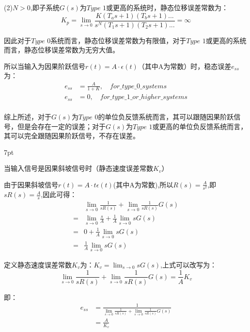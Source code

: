 \documentclass{article}
\numberwithin{equation}{section}
\numberwithin{figure}{section}
\newenvironment{formal}{%
\def\FrameCommand{%
\hspace{1pt}%
{\color{DarkBlue}\vrule width 2pt}%
{\color{formalshade}\vrule width 4pt}%
\colorbox{formalshade}%
}%
\MakeFramed{\advance\hsize-\width\FrameRestore}%
\noindent\hspace{-4.55pt}%
\begin{adjustwidth}{}{7pt}%
\vspace{2pt}\vspace{2pt}%
}
{%
\vspace{2pt}\end{adjustwidth}\endMakeFramed%
}
\begin{document}
    (2)$N>0$,即子系统$G(s)$为$Type$ $1$或更高的系统时，静态位移误差常数为：
    \begin{equation}
        K_p=\lim_{s\rightarrow 0}\frac{K(T_as+1)(T_bs+1)...}{s^N(T_1s+1)(T_2s+1)...}=\infty
    \end{equation}
    
    因此对于$Type$ $0$系统而言，静态位移误差常数为有限值，对于$Type$ $1$或更高的系统而言，静态位移误差常数为无穷大值。

    所以当输入为因果阶跃信号$r(t)=A·\epsilon(t)$（其中A为常数）时，稳态误差$e_{ss}$为：
\begin{equation}
    \begin{split}
        e_{ss}&=\frac{A}{1+K},\quad for\_type\_0\_systems\\
        e_{ss}&=0,\quad for\_type\_1\_or\_higher\_systems\\
    \end{split}
\end{equation}

综上所述，对于$G(s)$为$Type$ $0$的单位负反馈系统而言，其可以跟随因果阶跃信号，但是会存在一定的误差；对于$G(s)$为$Type$ $1$或更高的单位负反馈系统而言，其可以完全跟随因果阶跃信号，不存在误差。

\begin{formal}
    当输入信号是因果斜坡信号时（静态速度误差常数$K_v$）
\end{formal}

由于因果斜坡信号$r(t)=A·t\epsilon(t)$(其中A为常数),所以$R(s)=\frac{A}{s^2}$,即$sR(s)=\frac{A}{s}$,因此可得：
\begin{equation}
    \begin{split}
        &\lim_{s\rightarrow 0}\frac{1}{sR(s)}+\lim_{s\rightarrow 0}\frac{1}{sR(s)}G(s)\\
        =&\lim_{s\rightarrow 0}\frac{s}{A}+\frac{1}{A}\lim_{s\rightarrow 0}sG(s)\\
        =&0+\frac{1}{A}\lim_{s\rightarrow 0}sG(s)\\
        =&\frac{1}{A}\lim_{s\rightarrow 0}sG(s)
    \end{split}
\end{equation}

定义静态速度误差常数$K_v$为：$K_v=\lim_{s\rightarrow 0}sG(s)$,上式可以改写为：
\begin{equation}
    \lim_{s\rightarrow 0}\frac{1}{sR(s)}+\lim_{s\rightarrow 0}\frac{1}{sR(s)}G(s)=\frac{1}{A}K_v
\end{equation}

即：
\begin{equation}
    \begin{split}
        e_{ss}&=\frac{1}{\lim_{s\rightarrow 0}\frac{1}{sR(s)}+\lim_{s\rightarrow 0}\frac{1}{sR(s)}G(s)}\\
        &=\frac{A}{K_v}
    \end{split}
\end{equation}
\end{document}
